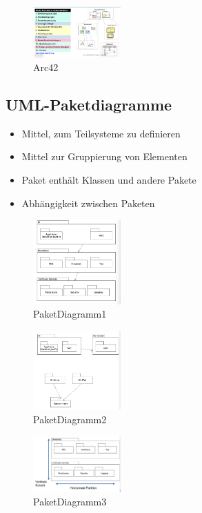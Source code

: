 \documentclass[../ZF_SWEN1.tex]{subfiles}
\begin{document}
\begin{figure}[H]			\includegraphics[width=0.3\textwidth] {Resources/Images/Arc42.png}
\caption{\label{fig:Arc42}Arc42}
\end{figure}

\subsection{UML-Paketdiagramme}

\begin{itemize}
	\item Mittel, zum Teilsysteme zu definieren
	\item Mittel zur Gruppierung von Elementen
	\item Paket enthält Klassen und andere Pakete
	\item Abhängigkeit zwischen Paketen
\end{itemize}


\begin{multicols}{3}
\begin{figure}[H]			\includegraphics[width=0.3\textwidth] {Resources/Images/PaketDiagramm1.png}
\caption{\label{fig:PaketDiagramm1}PaketDiagramm1}
\end{figure}
\columnbreak
\begin{figure}[H]			\includegraphics[width=0.3\textwidth] {Resources/Images/PaketDiagramm2.png}
\caption{\label{fig:PaketDiagramm2}PaketDiagramm2}
\end{figure}

\columnbreak
\begin{figure}[H]			\includegraphics[width=0.3\textwidth] {Resources/Images/PaketDiagramm3.png}
\caption{\label{fig:PaketDiagramm3}PaketDiagramm3}
\end{figure}

\end{multicols}
\end{document}

